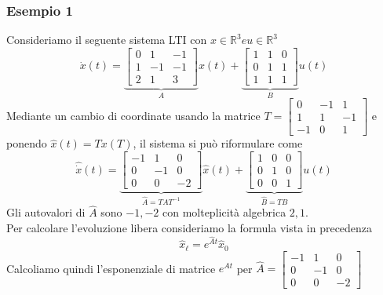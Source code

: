 \documentclass{article}
\numberwithin{equation}{subsection}
\begin{document}
\subsubsection{Esempio 1}
Consideriamo il seguente sistema LTI con $x \in \mathbb{R}^3 e u \in \mathbb{R}^3$
\begin{equation}
    \dot x(t) = \underbrace{\begin{bmatrix}
        0 & 1 & -1\\
        1 & -1 & -1\\
        2 & 1 & 3 
    \end{bmatrix}}_{A} x(t) +
    \underbrace{\begin{bmatrix}
        1 & 1 & 0\\
        0 & 1 & 1\\
        1 & 1 & 1
    \end{bmatrix}}_{B} u(t)
\end{equation}
Mediante un cambio di coordinate usando la matrice $T = \begin{bmatrix}
    0 & -1 & 1\\ 1 & 1 & -1\\ -1 & 0 & 1
\end{bmatrix}$ e ponendo $\hat x(t) = T x(T)$, il sistema si può riformulare come 
\begin{equation}
    \hat{\dot x} (t)= \underbrace{\begin{bmatrix}
        -1 & 1 & 0\\
        0 & -1 & 0\\
        0 & 0 & -2 
    \end{bmatrix}}_{\hat A = TAT^{-1}} \hat x(t) +
    \underbrace{\begin{bmatrix}
        1 & 0 & 0\\
        0 & 1 & 0\\
        0 & 0 & 1
    \end{bmatrix}}_{\hat B = TB} u(t)
\end{equation}
Gli autovalori di $\hat A$ sono $-1, -2$ con molteplicità algebrica $2,1$.
\vspace*{0.2cm}\\
Per calcolare l'evoluzione libera consideriamo la formula vista in precedenza
\begin{equation}
    \hat x_\ell  =e^{\hat A t}\hat x_0
\end{equation}
Calcoliamo quindi l'esponenziale di matrice $e^{\hat A t}$ per $\hat A = \begin{bmatrix}
    -1 & 1 & 0\\
    0 & -1 & 0\\
    0 & 0 & -2
\end{bmatrix}$
\end{document}
